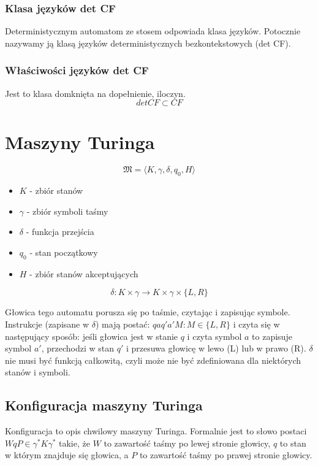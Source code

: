 \documentclass{../notatki}
\begin{document}
\subsubsection{Klasa języków det CF}

Deterministycznym automatom ze stosem odpowiada klasa języków.
Potocznie nazywamy ją klasą języków deterministycznych
bezkontekstowych (det CF).

\subsubsection{Właściwości języków det CF}

Jest to klasa domknięta na dopełnienie, iloczyn.
$$
det CF \subset CF
$$

\section{Maszyny Turinga}
\label{sec:maszyny-turinga}

$$
\mathfrak{M} = \langle K, \gamma, \delta, q_0, H \rangle
$$

\begin{itemize}
  \item $K$ - zbiór stanów
  \item $\gamma$ - zbiór symboli taśmy
  \item $\delta$ - funkcja przejścia
  \item $q_0$ - stan początkowy
  \item $H$ - zbiór stanów akceptujących
\end{itemize}

$$
\delta: K \times \gamma \rightarrow K \times \gamma \times \{L, R\}
$$

Głowica tego automatu porusza się po taśmie, czytając i zapisując symbole.
Instrukcje (zapisane w $\delta$) mają postać: $qaq'a'M : M \in \{L,
R\}$ i czyta się w następujący
sposób: jeśli głowica jest w stanie $q$ i czyta symbol $a$ to zapisuje symbol
$a'$, przechodzi w stan $q'$ i przesuwa głowicę w lewo (L) lub w prawo (R).
$\delta$ nie musi być funkcją całkowitą, czyli może nie być zdefiniowana dla
niektórych stanów i symboli.

\subsection{Konfiguracja maszyny Turinga}

Konfiguracja to opis chwilowy maszyny Turinga. Formalnie jest to słowo
postaci $WqP \in \gamma^*K\gamma^*$ takie, że $W$ to zawartość taśmy po lewej
stronie głowicy, $q$ to stan w którym znajduje się głowica, a $P$ to zawartość
taśmy po prawej stronie głowicy.
\end{document}
